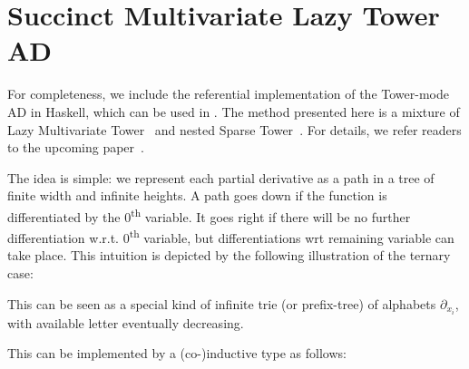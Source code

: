 \documentclass[runningheads]{llncs}
\begin{document}
\section{Succinct Multivariate Lazy Tower AD}\label{sec:appendix}
For completeness, we include the referential implementation of the Tower-mode AD in Haskell, which can be used in .
The method presented here is a mixture of Lazy Multivariate Tower~\cite{Pearlmutter:2007aa} and nested Sparse Tower~\cite{Kmett:2010aa}.
For details, we refer readers to the upcoming paper~\cite{Ishii:2021ab}.

The idea is simple: we represent each partial derivative as a path in a tree of finite width and infinite heights.
A path goes down if the function is differentiated by the 0\textsuperscript{th} variable.
It goes right if there will be no further differentiation w.r.t. 0\textsuperscript{th} variable, but differentiations wrt remaining variable can take place.
This intuition is depicted by the following illustration of the ternary case:

\begin{center}
\end{center}

This can be seen as a special kind of infinite trie (or prefix-tree) of alphabets $\partial_{x_i}$, with available letter eventually decreasing.

This can be implemented by a (co-)inductive type as follows:
\end{document}
